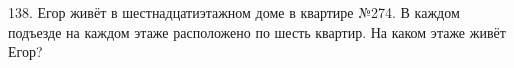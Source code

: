 138. Егор живёт в шестнадцатиэтажном доме в квартире №274. В каждом подъезде на каждом этаже расположено по шесть квартир. На каком этаже живёт Егор?\\
